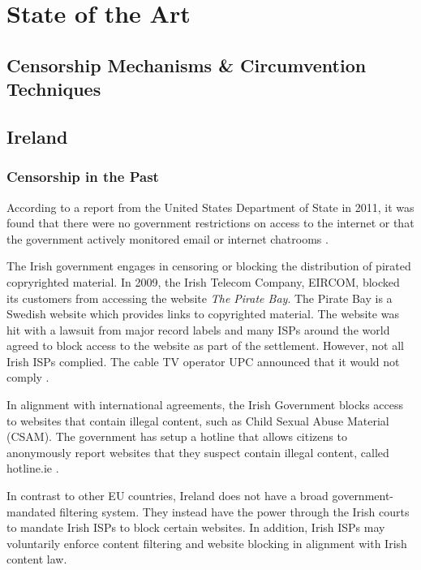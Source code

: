 \chapter{State of the Art}
\section{Censorship Mechanisms \& Circumvention Techniques}



\section{Ireland}

\subsection{Censorship in the Past}

According to a report from the United States Department of State in 2011, it was found that there were no government restrictions on access to the internet or that the government actively monitored email or internet chatrooms \cite{stateTechnicalDifficulties}.

The Irish government engages in censoring or blocking the distribution of pirated copryrighted material. In 2009, the Irish Telecom Company, EIRCOM, blocked its customers from accessing the website \textit{The Pirate Bay}. The Pirate Bay is a Swedish website which provides links to copyrighted material. The website was hit with a lawsuit from major record labels and many ISPs around the world agreed to block access to the website as part of the settlement. However, not all Irish ISPs complied. The cable TV operator UPC announced that it would not comply \cite{irishtimesEircomBlock}. 

In alignment with international agreements, the Irish Government blocks access to websites that contain illegal content, such as Child Sexual Abuse Material (CSAM). The government has setup a hotline that allows citizens to anonymously report websites that they suspect contain illegal content, called hotline.ie \cite{hotlineAboutx2013}.

In contrast to other EU countries, Ireland does not have a broad government-mandated filtering system. They instead have the power through the Irish courts to mandate Irish ISPs to block certain websites. In addition, Irish ISPs may voluntarily enforce content filtering and website blocking in alignment with Irish content law.

